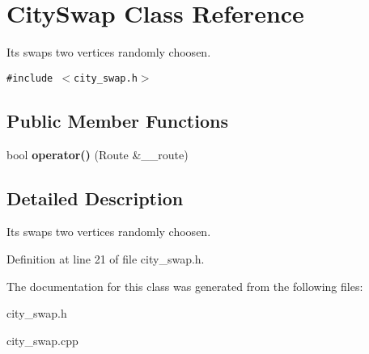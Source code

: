 \section{CitySwap Class Reference}
\label{class_city_swap}
Its swaps two vertices randomly choosen.  


{\tt \#include $<$city\_\-swap.h$>$}

\subsection*{Public Member Functions}
\begin{CompactItemize}
\item 
bool {\bf operator()} (Route \&\_\-\_\-route)\label{class_city_swap_7e6958b62048c89604cbf046b86bdf2d}

\end{CompactItemize}


\subsection{Detailed Description}
Its swaps two vertices randomly choosen. 



Definition at line 21 of file city\_\-swap.h.

The documentation for this class was generated from the following files:\begin{CompactItemize}
\item 
city\_\-swap.h\item 
city\_\-swap.cpp\end{CompactItemize}
